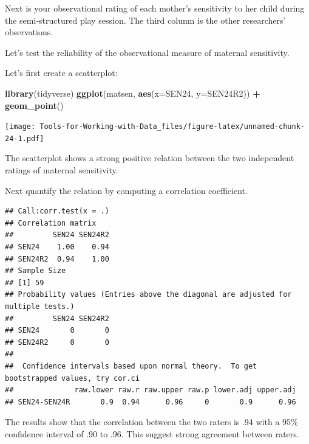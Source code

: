 \documentclass[
]{book}
\newenvironment{Shaded}{\begin{snugshade}}{\end{snugshade}}
\newcommand{\DataTypeTok}[1]{\textcolor[rgb]{0.13,0.29,0.53}{#1}}
\newcommand{\KeywordTok}[1]{\textcolor[rgb]{0.13,0.29,0.53}{\textbf{#1}}}
\newcommand{\NormalTok}[1]{#1}
\newcommand{\OperatorTok}[1]{\textcolor[rgb]{0.81,0.36,0.00}{\textbf{#1}}}
\newcommand{\OtherTok}[1]{\textcolor[rgb]{0.56,0.35,0.01}{#1}}
\newcommand{\StringTok}[1]{\textcolor[rgb]{0.31,0.60,0.02}{#1}}
\begin{document}
Next is your observational rating of each mother's sensitivity to her child during the semi-structured play session. The third column is the other researchers' observations.

Let's test the reliability of the observational measure of maternal sensitivity.

Let's first create a scatterplot:

\begin{Shaded}
\begin{Highlighting}[]
\KeywordTok{library}\NormalTok{(tidyverse)}
\KeywordTok{ggplot}\NormalTok{(matsen, }\KeywordTok{aes}\NormalTok{(}\DataTypeTok{x=}\NormalTok{SEN24, }\DataTypeTok{y=}\NormalTok{SEN24R2)) }\OperatorTok{+}
\StringTok{  }\KeywordTok{geom_point}\NormalTok{()}
\end{Highlighting}
\end{Shaded}

\texttt{[image: Tools-for-Working-with-Data\_files/figure-latex/unnamed-chunk-24-1.pdf]}

The scatterplot shows a strong positive relation between the two independent ratings of maternal sensitivity.

Next quantify the relation by computing a correlation coefficient.

\begin{Shaded}
\end{Shaded}

\begin{verbatim}
## Call:corr.test(x = .)
## Correlation matrix 
##         SEN24 SEN24R2
## SEN24    1.00    0.94
## SEN24R2  0.94    1.00
## Sample Size 
## [1] 59
## Probability values (Entries above the diagonal are adjusted for multiple tests.) 
##         SEN24 SEN24R2
## SEN24       0       0
## SEN24R2     0       0
## 
##  Confidence intervals based upon normal theory.  To get bootstrapped values, try cor.ci
##              raw.lower raw.r raw.upper raw.p lower.adj upper.adj
## SEN24-SEN24R       0.9  0.94      0.96     0       0.9      0.96
\end{verbatim}

The results show that the correlation between the two raters is .94 with a 95\% confidence interval of .90 to .96. This suggest strong agreement between raters.
\end{document}
